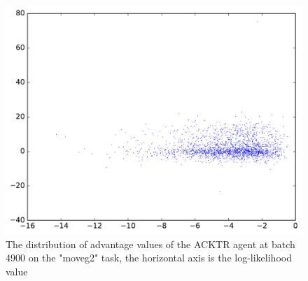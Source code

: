 \begin{figure}[!htbp]
	\includegraphics[width=\textwidth]{images/vis_stats_4900.pdf}
	\centering
	\caption{The distribution of advantage values of the ACKTR agent at batch 4900 on the "moveg2" task, the horizontal axis is the log-likelihood value}
	\label{vis_stats_4900}
\end{figure}


